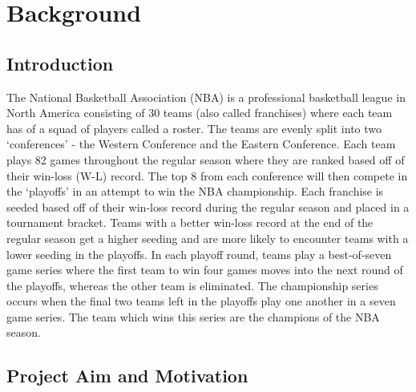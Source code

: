 \documentclass[a4paper,11pt,twoside]{article}
\begin{document}
\tableofcontents
\newpage

\section{Background}
\vspace{6mm}

\subsection{Introduction}

The National Basketball Association (NBA) is a professional basketball league in North America consisting of 30 teams (also called franchises) where each team has of a squad of players called a roster. The teams are evenly split into two `conferences' - the Western Conference and the Eastern Conference. Each team plays 82 games throughout the regular season where they are ranked based off of their win-loss (W-L) record. The top 8 from each conference will then compete in the `playoffs' in an attempt to win the NBA championship. Each franchise is seeded based off of their win-loss record during the regular season and placed in a tournament bracket. Teams with a better win-loss record at the end of the regular season get a higher seeding and are more likely to encounter teams with a lower seeding in the playoffs. In each playoff  round, teams play a best-of-seven game series where the first team to win four games moves into the next round of the playoffs, whereas the other team is eliminated. The championship series occurs when the final two teams left in the playoffs play one another in a seven game series. The team which wins this series are the champions of the NBA season.


\subsection{Project Aim and Motivation}
\end{document}
